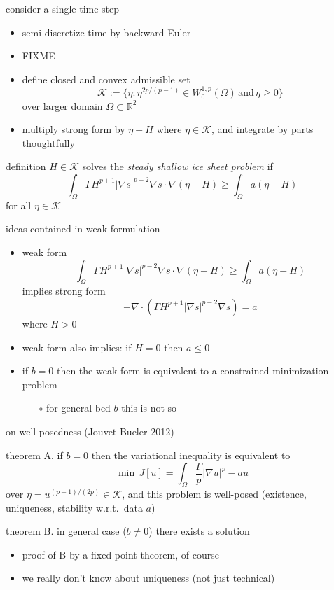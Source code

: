 \documentclass[hide notes,intlimits,usenames,dvipsnames]{beamer}
\newcommand{\RR}{\mathbb{R}}
\newcommand{\Kcal}{\mathcal{K}}
\newcommand{\Div}{\nabla\cdot}
\newcommand{\grad}{\nabla}
\begin{document}
\begin{frame}{consider a single time step} 
\begin{itemize}
\item semi-discretize time by backward Euler
\item FIXME
\item define closed and convex admissible set
  $$\Kcal := \{\eta : \eta^{2p/(p-1)} \in W^{1,p}_0 (\Omega) \,\text{and}\, \eta \ge 0\}$$
over larger domain $\Omega \subset \RR^2$
\item multiply strong form by $\eta-H$ where $\eta\in \Kcal$, and integrate by parts thoughtfully
\end{itemize}
\begin{block}{definition} 
$H \in \Kcal$ solves the \emph{steady shallow ice sheet problem} if
  $$\int_{\Omega}  \Gamma H^{p+1} |\grad s|^{p-2} \grad s \cdot \grad(\eta - H)  
\ge \int_{\Omega} a (\eta - H)$$
for all $\eta \in \Kcal$
\end{block}
\end{frame}


\begin{frame}{ideas contained in weak formulation} 
\begin{itemize}
\item weak form
  $$\int_{\Omega}  \Gamma H^{p+1} |\grad s|^{p-2} \grad s \cdot \grad(\eta - H)  
\ge \int_{\Omega} a (\eta - H)$$
implies strong form
  $$-\Div \left(\Gamma H^{p+1} |\nabla s|^{p-2} \nabla s  \right) =  a$$
where $H>0$
\item weak form also implies: if $H=0$ then $a \le 0$
\item if $b=0$ then the weak form is equivalent to a constrained minimization problem
  \begin{itemize}
  \item[$\circ$] for general bed $b$ this is not so
  \end{itemize}
\end{itemize}
\end{frame}


\begin{frame}{on well-posedness (Jouvet-Bueler 2012)} 
\begin{block}{theorem A.}
if $b=0$ then the variational inequality is equivalent to
  $$\min \, J[u] = \int_{\Omega} \frac{\Gamma}{p} |\grad u|^p - a u$$
over $\eta = u^{(p-1)/(2p)} \in \Kcal$, and this problem is well-posed (existence, uniqueness, stability w.r.t.~data $a$)
\end{block}
\begin{block}{theorem B.}
in general case ($b\ne 0$) there exists a solution
\end{block}
\begin{itemize}
\item proof of B by a fixed-point theorem, of course
\item we really don't know about uniqueness (not just technical)
\end{itemize}
\end{frame}
\end{document}
